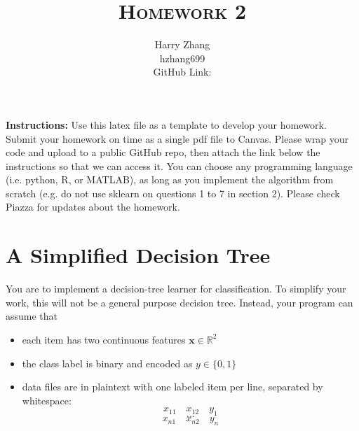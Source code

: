\documentclass[a4paper]{article}
\title{\textsc{Homework 2}} %
\author{
Harry Zhang \\
hzhang699\\
GitHub Link: \url{}
}
\date{}
\theoremstyle{definition}
\newcommand{\RR}{\mathbb{R}}
\def\x{\mathbf x}
\begin{document}
\maketitle 


\textbf{Instructions:} 
Use this latex file as a template to develop your homework. Submit your homework on time as a single pdf file to Canvas. Please wrap your code and upload to a public GitHub repo, then attach the link below the instructions so that we can access it. You can choose any programming language (i.e. python, R, or MATLAB), as long as you implement the algorithm from scratch (e.g. do not use sklearn on questions 1 to 7 in section 2). Please check Piazza for updates about the homework.

\section{A Simplified Decision Tree}
You are to implement a decision-tree learner for classification.
To simplify your work, this will not be a general purpose decision tree.  Instead, your program can assume that
\begin{itemize}
\item each item has two continuous features $\x \in \RR^2$
\item the class label is binary and encoded as $y \in \{0,1\}$
\item data files are in plaintext with one labeled item per line, separated by whitespace:
$$x_{11} \quad x_{12} \quad y_1$$
$$...$$
$$x_{n1} \quad x_{n2} \quad y_n$$
\end{itemize}
\end{document}
